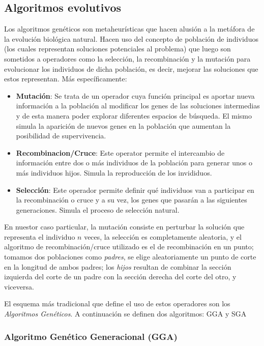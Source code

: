 \documentclass{ci5652}
\begin{document}
\subsection{Algoritmos evolutivos}
Los algoritmos genéticos son metaheurísticas que hacen alusión a la metáfora de la evolución biológica natural. Hacen uso del concepto de población de individuos (los cuales representan soluciones potenciales al problema) que luego son sometidos a operadores como la selección, la recombinación y la mutación para evolucionar los individuos de dicha población, es decir, mejorar las soluciones que estos representan. Más específicamente:

\begin{itemize}
\item \textbf{Mutación}: Se trata de un operador cuya función principal es aportar nueva información a la población al modificar los genes de las soluciones intermedias y de esta manera poder explorar diferentes espacios de búsqueda. El mismo simula la aparición de nuevos genes en la población que aumentan la posibilidad de supervivencia.

\item \textbf{Recombinacion/Cruce}: Este operator permite el intercambio de información entre dos o más individuos de la población para generar unos o más individuos hijos. Simula la reproducción de los invididuos.

\item \textbf{Selección}: Este operador permite definir qué individuos van a participar en la recombinación o cruce y a su vez, los genes que pasarán a las siguientes generaciones. Simula el proceso de selección natural.
\end{itemize}

En nuestor caso particular, la mutación consiste en perturbar la solución que representa el individuo $n$ veces, la selección es completamente aleatoria, y el algoritmo de recombinación/cruce utilizado es el de recombinación en un punto; tomamos dos poblaciones como \textit{padres}, se elige aleatoriamente un punto de corte en la longitud de ambos padres; los \textit{hijos} resultan de combinar la sección izquierda del corte de un padre con la sección derecha del corte del otro, y viceversa.

El esquema más tradicional que define el uso de estos operadores son los \textit{Algoritmos Genéticos}. A continuación se definen dos algoritmos: GGA y SGA

\subsubsection{Algoritmo Genético Generacional (GGA)}
\end{document}

